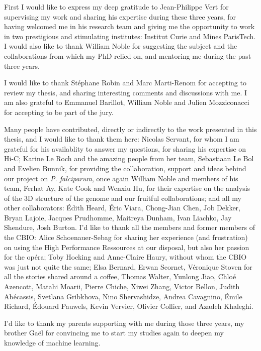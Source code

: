 

\begin{acknowledgements}      %

First I would like to express my deep gratitude to Jean-Philippe Vert for
supervising my work and sharing his expertise during these three years, for
having welcomed me in his research team and giving me the opportunity to work
in two prestigious and stimulating institutes: Institut Curie and Mines
ParisTech. I would also like to thank William Noble for suggesting the subject
and the collaborations from which my PhD relied on, and mentoring me during
the past three years.

I would like to thank St\'ephane Robin and Marc Marti-Renom for accepting to
review my thesis, and sharing interesting comments and discussions with me. I
am also grateful to Emmanuel Barillot, William Noble and Julien Mozziconacci
for accepting to be part of the jury.

Many people have contributed, directly or indirectly to the work presented in
this thesis, and I would like to thank them here: Nicolas Servant, for whom I
am grateful for his availablity to answer my questions, for sharing his
expertise on Hi-C; Karine Le Roch and the amazing people from her team,
Sebastiaan Le Bol and Evelien Bunnik, for providing the collaboration, support
and ideas behind our project on \textit{P. falciparum}, once again William
Noble and members of his team, Ferhat Ay, Kate Cook and Wenxiu Hu, for their
expertise on the analysis of the 3D structure of the genome and our fruitful
collaborations; and all my other collaborators: Édith Heard, Éric Viara,
Chong-Jian Chen, Job Dekker, Bryan Lajoie, Jacques Prudhomme, Maitreya Dunham,
Ivan Liachko, Jay Shendure, Josh Burton. I'd like to thank all the members and
former members of the CBIO: Alice Schoenauer-Sebag for sharing her experience
(and frustration) on using the High Performance Ressources at our disposal,
but also her passion for the op\'era; Toby Hocking and Anne-Claire Haury,
without whom the CBIO was just not quite the same; Elsa Bernard, Erwan
Scornet, Véronique Stoven for all the stories shared around a coffee, Thomas
Walter, Yunlong Jiao, Chloé Azencott, Matahi Moarii, Pierre Chiche, Xiwei
Zhang, Victor Bellon, Judith Abécassis, Svetlana Gribkhova, Nino Shervashidze,
Andrea Cavagnino, Émile Richard, Édouard Pauwels, Kevin Vervier, Olivier
Collier, and Azadeh Khaleghi.

I'd like to thank my parents supporting with me during those three years, my
brother Ga\"el for convincing me to start my studies again to deepen my
knowledge of machine learning.

\end{acknowledgements}



